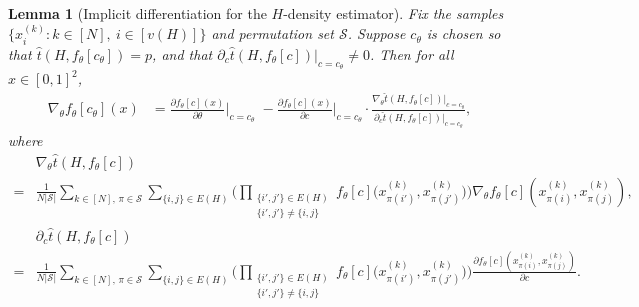 \documentclass[11pt]{article}
\theoremstyle{plain}
\newtheorem{lemma}{Lemma}[section]
\theoremstyle{definition}
\theoremstyle{remark}
\begin{document}
\begin{lemma}[Implicit differentiation for the $H$-density estimator]
\label{lem:implicitdifferentiation:Hdensity}
Fix the samples \(\{x_i^{(k)} : k\in[N],\ i\in[v(H)]\}\) and permutation set \(\mathcal{S}\). Suppose \(c_\theta\) is chosen so that
\(\widehat{t}(H,f_\theta[c_\theta]) = p\), and that \(\partial_c\widehat{t}(H,f_\theta[c])\big|_{c=c_\theta} \neq 0\).
Then for all \(x \in [0,1]^2\),
\begin{align*}
\nabla_\theta f_\theta[c_\theta](x)
&= \frac{\partial f_\theta[c](x)}{\partial \theta}\Big|_{c=c_\theta}
\;-
\frac{\partial f_\theta[c](x)}{\partial c}\Big|_{c=c_\theta}
\cdot
\frac{\nabla_\theta\widehat{t}(H,f_\theta[c])\big|_{c=c_\theta}}{\partial_c\widehat{t}(H,f_\theta[c])\big|_{c=c_\theta}},
\end{align*}
where
\begin{align*}
&\nabla_\theta\widehat{t}(H,f_\theta[c])
\\
{} = &\frac{1}{N|\mathcal{S}|}
\sum_{k\in[N],\,\pi\in\mathcal{S}}
\sum_{\{i,j\}\in E(H)}
\Bigg(\prod_{\substack{\{i',j'\}\in E(H)\\ \{i',j'\}\neq\{i,j\}}}
f_\theta[c]\bigl(x_{\pi(i')}^{(k)},x_{\pi(j')}^{(k)}\bigr)\Bigg)
\nabla_\theta f_\theta[c](x_{\pi(i)}^{(k)},x_{\pi(j)}^{(k)}),
\\
&\partial_c\widehat{t}(H,f_\theta[c])
\\
{} = &\frac{1}{N|\mathcal{S}|}
\sum_{k\in[N],\,\pi\in\mathcal{S}}
\sum_{\{i,j\}\in E(H)}
\Bigg(\prod_{\substack{\{i',j'\}\in E(H)\\ \{i',j'\}\neq\{i,j\}}}
f_\theta[c]\bigl(x_{\pi(i')}^{(k)},x_{\pi(j')}^{(k)}\bigr)\Bigg)
\frac{\partial f_\theta[c](x_{\pi(i)}^{(k)},x_{\pi(j)}^{(k)})}{\partial c}.
\end{align*}
\end{lemma}
\end{document}
